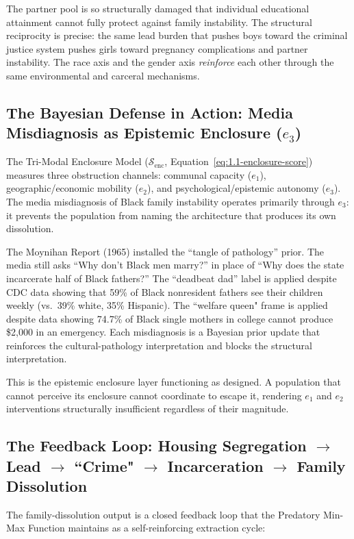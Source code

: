 The partner pool is so structurally damaged that individual educational attainment cannot fully protect against family instability. The structural reciprocity is precise: the same lead burden that pushes boys toward the criminal justice system pushes girls toward pregnancy complications and partner instability. The race axis and the gender axis \textit{reinforce} each other through the same environmental and carceral mechanisms.

\subsection{The Bayesian Defense in Action: Media Misdiagnosis as Epistemic Enclosure ($e_3$)}

The Tri-Modal Enclosure Model ($\mathcal{S}_{\text{enc}}$, Equation~\ref{eq:1.1-enclosure-score}) measures three obstruction channels: communal capacity ($e_1$), geographic/economic mobility ($e_2$), and psychological/epistemic autonomy ($e_3$). The media misdiagnosis of Black family instability operates primarily through $e_3$: it prevents the population from naming the architecture that produces its own dissolution.

The Moynihan Report (1965) installed the ``tangle of pathology'' prior. The media still asks ``Why don't Black men marry?'' in place of ``Why does the state incarcerate half of Black fathers?'' The ``deadbeat dad'' label is applied despite CDC data showing that 59\% of Black nonresident fathers see their children weekly (vs.~39\% white, 35\% Hispanic). The ``welfare queen" frame is applied despite data showing 74.7\% of Black single mothers in college cannot produce \$2,000 in an emergency. Each misdiagnosis is a Bayesian prior update that reinforces the cultural-pathology interpretation and blocks the structural interpretation.

This is the epistemic enclosure layer functioning as designed. A population that cannot perceive its enclosure cannot coordinate to escape it, rendering $e_1$ and $e_2$ interventions structurally insufficient regardless of their magnitude.

\subsection{The Feedback Loop: Housing Segregation $\rightarrow$ Lead $\rightarrow$ ``Crime" $\rightarrow$ Incarceration $\rightarrow$ Family Dissolution}

The family-dissolution output is a closed feedback loop that the Predatory Min-Max Function maintains as a self-reinforcing extraction cycle:

